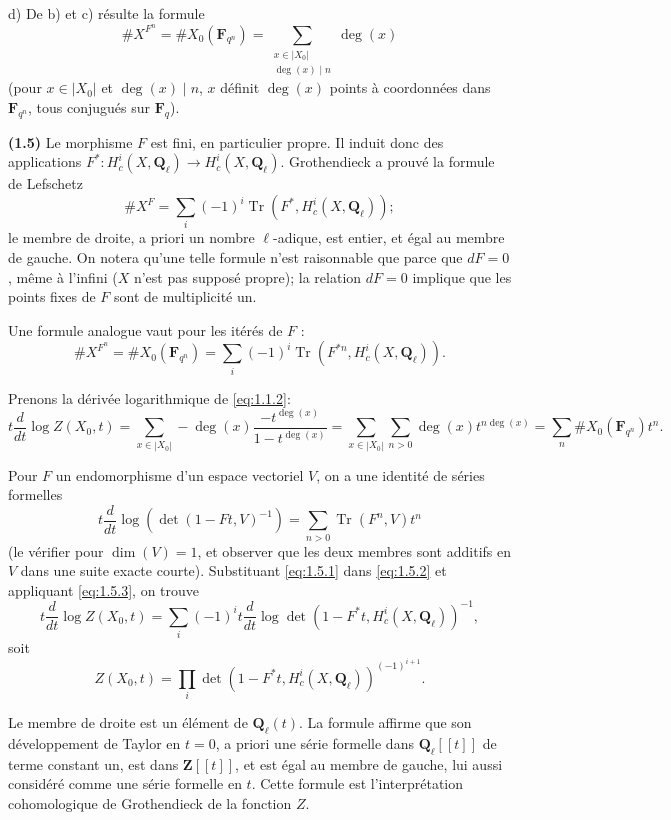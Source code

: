 \documentclass[12pt,a4paper]{amsart}
\theoremstyle{plain}
\theoremstyle{definition}
\theoremstyle{remark}
\DeclareMathOperator{\Tr}{Tr}
\newcommand{\Q}{\mathbf{Q}}
\newcommand{\Z}{\mathbf{Z}}
\newcommand{\F}{\mathbf{F}}
\numberwithin{equation}{section}
\begin{document}
d) De b) et c) r\'esulte la formule
\begin{equation}\label{eq:1.4.1}
\#X^{F^n} = \#X_0(\F_{q^n}) = \sum_{\substack{x\in|X_0|\\ \deg(x)\mid n}} \deg(x)
\end{equation}
(pour $x\in|X_0|$ et $\deg(x)\mid n$, $x$ d\'efinit $\deg(x)$ points \`a coordonn\'ees dans $\F_{q^n}$, tous conjugu\'es sur $\F_q$).

\noindent \textbf{(1.5)} Le morphisme $F$ est fini, en particulier propre. Il induit donc des applications
$F^*:H^i_c(X,\Q_\ell)\to H^i_c(X,\Q_\ell)$.
Grothendieck a prouv\'e la formule de Lefschetz
\[
\#X^F = \sum_i (-1)^i \Tr(F^*, H^i_c(X,\Q_\ell));
\]
le membre de droite, a priori un nombre $\ell$-adique, est entier, et \'egal au membre de gauche. On notera qu'une telle formule n'est raisonnable que parce que $dF=0$, m\^eme \`a l'infini ($X$ n'est pas suppos\'e propre); la relation $dF=0$ implique que les points fixes de $F$ sont de multiplicit\'e un.

Une formule analogue vaut pour les it\'er\'es de $F$ :
\begin{equation}\label{eq:1.5.1}
\#X^{F^n} = \#X_0(\F_{q^n}) = \sum_i (-1)^i \Tr(F^{*n}, H^i_c(X,\Q_\ell)).
\end{equation}

Prenons la d\'eriv\'ee logarithmique de \eqref{eq:1.1.2}:
\begin{equation}\label{eq:1.5.2}
t\frac{d}{dt}\log Z(X_0,t) = \sum_{x\in|X_0|} -\deg(x)\frac{-t^{\deg(x)}}{1-t^{\deg(x)}} = \sum_{x\in|X_0|}\sum_{n>0}\deg(x)t^{n\deg(x)} = \sum_n \#X_0(\F_{q^n}) t^n.
\end{equation}

Pour $F$ un endomorphisme d'un espace vectoriel $V$, on a une identit\'e de s\'eries formelles
\begin{equation}\label{eq:1.5.3}
t\frac{d}{dt}\log(\det(1-Ft,V)^{-1}) = \sum_{n>0} \Tr(F^n,V)t^n
\end{equation}
(le v\'erifier pour $\dim(V)=1$, et observer que les deux membres sont additifs en $V$ dans une suite exacte courte). Substituant \eqref{eq:1.5.1} dans \eqref{eq:1.5.2} et appliquant \eqref{eq:1.5.3}, on trouve
\[
t\frac{d}{dt}\log Z(X_0,t) = \sum_i (-1)^i t\frac{d}{dt}\log\det(1-F^*t, H^i_c(X,\Q_\ell))^{-1},
\]
soit
\begin{equation}\label{eq:1.5.4}
Z(X_0,t) = \prod_i \det(1-F^*t, H^i_c(X,\Q_\ell))^{(-1)^{i+1}}.
\end{equation}

Le membre de droite est un \'el\'ement de $\Q_\ell(t)$. La formule affirme que son d\'eveloppement de Taylor en $t=0$, a priori une s\'erie formelle dans $\Q_\ell[[t]]$ de terme constant un, est dans $\Z[[t]]$, et est \'egal au membre de gauche, lui aussi consid\'er\'e comme une s\'erie formelle en $t$. Cette formule est l'interpr\'etation cohomologique de Grothendieck de la fonction $Z$.
\end{document}
